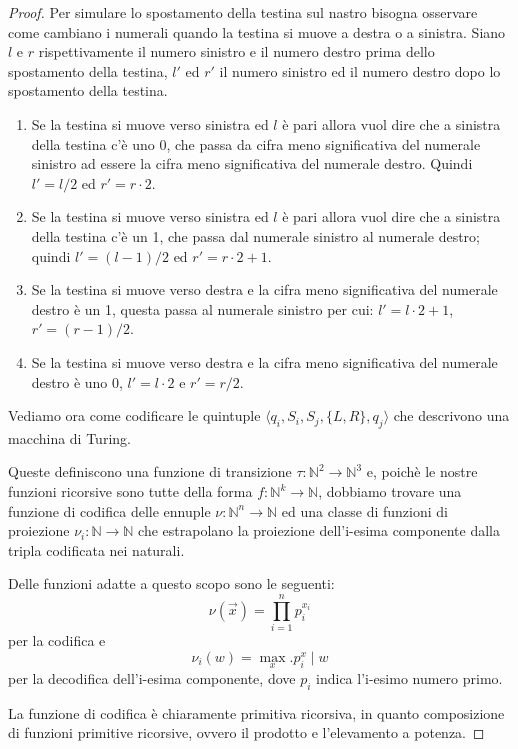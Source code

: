 \begin{proof}
Per simulare lo spostamento della testina sul nastro bisogna osservare come
cambiano i numerali quando la testina si muove a destra o a sinistra. Siano $l$
e $r$ rispettivamente il numero sinistro e il numero destro prima dello
spostamento della testina, $l'$ ed $r'$ il numero sinistro ed il numero destro
dopo lo spostamento della testina.
\begin{enumerate}
 \item Se la testina si muove verso sinistra ed $l$ è pari allora vuol dire che
a sinistra della testina c'è uno 0, che passa da cifra meno significativa del
numerale sinistro ad essere la cifra meno significativa del numerale destro.
Quindi $l' = l/2$ ed $r' = r \cdot 2$.
 \item Se la testina si muove verso sinistra ed $l$ è pari allora vuol dire che
a sinistra della testina c'è un 1, che passa dal numerale sinistro al numerale
destro; quindi $l' = (l-1)/2$ ed $r' = r \cdot 2 + 1$.
 \item Se la testina si muove verso destra e la cifra meno significativa del
numerale destro è un 1, questa passa al numerale sinistro per cui: $l' = l
\cdot 2 + 1$, $r' = (r-1)/2$.
 \item Se la testina si muove verso destra e la cifra meno significativa del
numerale destro è uno 0, $l' = l \cdot 2$ e $r' = r/2$.
\end{enumerate}

Vediamo ora come codificare le quintuple $\langle q_i, S_i, S_j, \{L,R\}, q_j
\rangle$ che descrivono una macchina di Turing.

Queste definiscono una funzione di transizione $\tau : \mathbb{N}^2
\rightarrow \mathbb{N}^3$ e, poichè le nostre funzioni ricorsive sono tutte
della forma $f:\mathbb{N}^k \rightarrow \mathbb{N}$, dobbiamo trovare una
funzione di codifica delle ennuple $\nu: \mathbb{N}^n \rightarrow \mathbb{N}$ ed
una classe di funzioni di proiezione $\nu_i: \mathbb{N} \rightarrow \mathbb{N}$
che estrapolano la proiezione dell'i-esima componente dalla tripla codificata
nei naturali.

Delle funzioni adatte a questo scopo sono le seguenti:
$$\nu(\overrightarrow{x}) = \prod_{i=1}^n p_i^{x_i}$$
per la codifica e
$$\nu_i(w) = \max_x.p_i^x \mid w$$
per la decodifica dell'i-esima componente, dove $p_i$ indica l'i-esimo numero
primo.

La funzione di codifica è chiaramente primitiva ricorsiva, in quanto
composizione di funzioni primitive ricorsive, ovvero il prodotto e l'elevamento
a potenza.


\end{proof}
